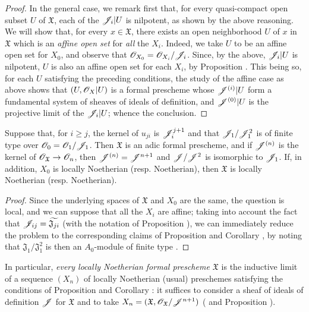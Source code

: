 \begin{proof}
In the general case, we remark first that, for every quasi-compact open subset $U$ of $\mathfrak{X}$, each of the $\mathscr{J}_i|U$ is nilpotent, as shown by the above reasoning.
We will show that, for every $x\in\mathfrak{X}$, there exists an open neighborhood $U$ of $x$ in $\mathfrak{X}$ which is an \emph{affine open set} for \emph{all} the $X_i$.
Indeed, we take $U$ to be an affine open set for $X_0$, and observe that $\mathscr{O}_{X_0}=\mathscr{O}_{X_i}/\mathscr{J}_i$.
Since, by the above, $\mathscr{J}_i|U$ is nilpotent, $U$ is also an affine open set for each $X_i$, by Proposition .
This being so, for each $U$ satisfying the preceding conditions, the study of the affine case as above shows that $(U,\mathscr{O}_X|U)$ is a formal prescheme whose $\mathscr{J}^{(i)}|U$ form a fundamental system of sheaves of ideals of definition, and $\mathscr{J}^{(0)}|U$ is the projective limit of the $\mathscr{J}_i|U$; whence the conclusion.
\end{proof}

\begin{corollary}[10.6.4]
\label{1.10.6.4}
Suppose that, for $i\geq j$, the kernel of $u_{ji}$ is $\mathscr{J}_i^{j+1}$ and that $\mathscr{J}_1/\mathscr{J}_1^2$
is of finite type over $\mathscr{O}_0=\mathscr{O}_1/\mathscr{J}_1$.
Then $\mathfrak{X}$ is an adic formal prescheme, and if $\mathscr{J}^{(n)}$ is the kernel of $\sh{O}_\mathfrak{X}\to\sh{O}_n$, then $\mathscr{J}^{(n)}=\mathscr{J}^{n+1}$ and $\mathscr{J}/\mathscr{J}^2$ is isomorphic to $\mathscr{J}_1$.
If, in addition, $X_0$ is locally Noetherian (resp. Noetherian), then $\mathfrak{X}$ is locally Noetherian (resp. Noetherian).
\end{corollary}

\begin{proof}
\label{proof-1.10.6.4}
Since the underlying spaces of $\mathfrak{X}$ and $X_0$ are the same, the question is local, and we can suppose that all the $X_i$ are affine; taking into account the fact that $\mathscr{J}_{ij}=\widetilde{\mathfrak{J}_{ji}}$ (with the notation of Proposition ), we can immediately reduce the problem to the corresponding claims of Proposition  and Corollary , by noting that $\mathfrak{J}_1/\mathfrak{J}_1^2$ is then an $A_0$-module of finite type .
\end{proof}

In particular, \emph{every locally Noetherian formal prescheme $\mathfrak{X}$} is the inductive limit of a sequence $(X_n)$ of locally Noetherian (usual) preschemes satisfying the conditions of Proposition  and Corollary : it suffices to consider a sheaf of ideals of definition $\mathscr{J}$ for $\mathfrak{X}$  and to take $X_n=(\mathfrak{X},\mathscr{O}_\mathfrak{X}/\mathscr{J}^{n+1})$ ( and Proposition ).

